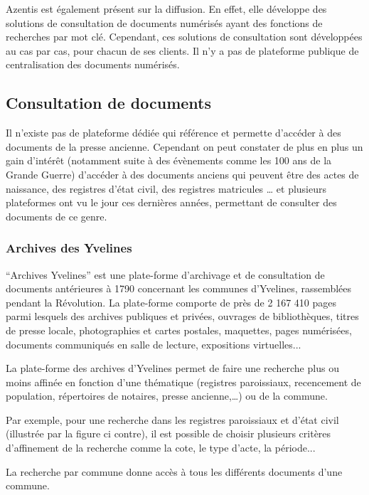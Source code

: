         Azentis est également présent sur la diffusion. En effet, elle développe des solutions de consultation de documents numérisés ayant
        des fonctions de recherches par mot clé. Cependant, ces solutions de consultation sont développées au cas par cas, pour chacun de ses clients.
        Il n'y a pas de plateforme publique de centralisation des documents numérisés.

    \subsection{Consultation de documents}
    \label{subsec:consultation}
    Il n’existe pas de plateforme dédiée qui référence et permette d’accéder à des documents de la presse ancienne. Cependant on peut constater
    de plus en plus un gain d’intérêt (notamment suite à des évènements comme les 100 ans de la Grande Guerre) d’accéder à des documents anciens
    qui peuvent être des actes de naissance, des registres d’état civil, des registres matricules … et plusieurs plateformes ont vu le jour
    ces dernières années, permettant de consulter des documents de ce genre.

        \subsubsection{Archives des Yvelines}
        \label{subsubsec:yvelines}
        “Archives Yvelines” est une plate-forme d’archivage et de consultation de documents antérieures à 1790 concernant les communes d’Yvelines,
        rassemblées pendant la Révolution. La plate-forme comporte de près de 2 167 410 pages parmi lesquels  des archives publiques et privées,
        ouvrages de bibliothèques, titres de presse locale, photographies et cartes postales, maquettes, pages numérisées, documents communiqués
        en salle de lecture, expositions virtuelles...

        La plate-forme des archives d’Yvelines permet de faire une recherche plus ou moins affinée en fonction d’une thématique (registres paroissiaux,
        recencement de population, répertoires de notaires, presse ancienne,…) ou de la commune.

        Par exemple, pour une recherche dans les registres paroissiaux et d’état civil (illustrée par la figure ci contre), il est possible de choisir
        plusieurs critères d’affinement de la recherche comme la cote, le type d’acte, la période...

        La recherche par commune donne accès à tous les différents documents d’une commune.

